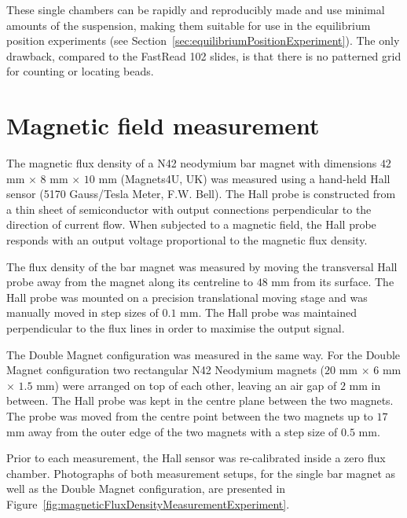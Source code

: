 These single chambers can be rapidly and reproducibly made and use minimal amounts of the suspension, making them suitable for use in the equilibrium position experiments (see Section~\ref{sec:equilibriumPositionExperiment}). The only drawback, compared to the FastRead 102 slides, is that there is no patterned grid for counting or locating beads.

\section{Magnetic field measurement}\label{sec:magneticForceMeasurement}
The magnetic flux density of a N42 neodymium bar magnet with dimensions $42$ mm $\times$ $8$ mm $\times$ $10$ mm (Magnets4U, UK) was measured using a hand-held Hall sensor (5170 Gauss/Tesla Meter, F.W. Bell). The Hall probe is constructed from a thin sheet of semiconductor with output connections perpendicular to the direction of current flow. When subjected to a magnetic field, the Hall probe responds with an output voltage proportional to the magnetic flux density.

The flux density of the bar magnet was measured by moving the transversal Hall probe away from the magnet along its centreline to $48$ mm from its surface. The Hall probe was mounted on a precision translational moving stage and was manually  moved in step sizes of $0.1$ mm. The Hall probe was maintained perpendicular to the flux lines in order to maximise the output signal. 

The Double Magnet configuration was measured in the same way. For the Double Magnet configuration two rectangular N42 Neodymium magnets ($20$ mm $\times$ $6$ mm $\times$ $1.5$ mm) were arranged on top of each other, leaving an air gap of $2$ mm in between. The Hall probe was kept in the centre plane between the two magnets. The probe was moved from the centre point between the two magnets up to $17$ mm away from the outer edge of the two magnets with a step size of $0.5$ mm.

Prior to each measurement, the Hall sensor was re-calibrated inside a zero flux chamber. Photographs of both measurement setups, for the single bar magnet as well as the Double Magnet configuration, are presented in Figure~\ref{fig:magneticFluxDensityMeasurementExperiment}.

